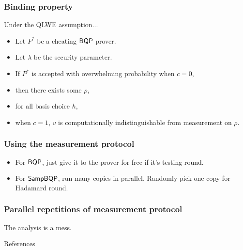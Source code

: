 \documentclass{beamer}
\begin{document}
\begin{frame}
	\frametitle{Binding property}
	Under the QLWE assumption...
	\begin{itemize}[<+->]
		\item Let $P^*$ be a cheating $\operatorname{\mathsf{BQP}}$ prover.
		\item Let $\lambda$ be the security parameter.
		\item If $P^*$ is accepted with overwhelming probability when $c=0$,
		\item then there exists some $\rho$,
		\item for all basis choice $h$,
		\item when $c=1$, $v$ is computationally indistinguishable from measurement on $\rho$.
	\end{itemize}
\end{frame}

\begin{frame}
	\frametitle{Using the measurement protocol}
	\begin{itemize}[<+->]
		\item For $\operatorname{\mathsf{BQP}}$, just give it to the prover for free if it's testing round.
		\item For $\operatorname{\mathsf{SampBQP}}$, run many copies in parallel. Randomly pick one copy for Hadamard round.
	\end{itemize}
\end{frame}

\begin{frame}
	\frametitle{Parallel repetitions of measurement protocol}
	The analysis is a mess.
\end{frame}

\begin{frame}{References}
	
	
\end{frame}
\end{document}
